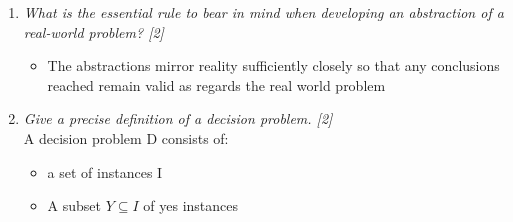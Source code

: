 \documentclass{article}[18pt]
\begin{document}
\begin{enumerate}
	\item \textit{What is the essential rule to bear in mind when developing an abstraction	of a real-world problem? [2]}
	\begin{itemize}
		\item The abstractions mirror reality sufficiently closely so that any conclusions reached remain valid as regards the real world problem
	\end{itemize}
	\item \textit{Give a precise definition of a decision problem. [2]}\\
	A decision problem D consists of:
	\begin{itemize}
		\item a set of instances I
		\item A subset $Y\subseteq I$ of yes instances
	\end{itemize}
	

\end{enumerate}
\end{document}
